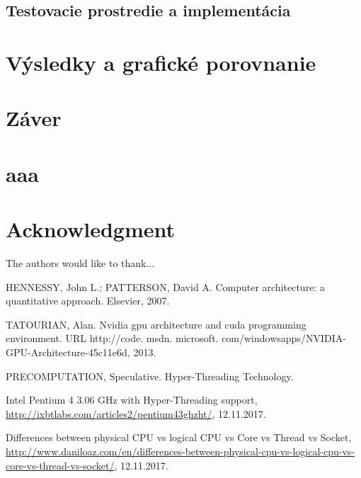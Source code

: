 \documentclass[conference]{IEEEtran}
\begin{document}
\subsection{Testovacie prostredie a implementácia}

\section{Výsledky a grafické porovnanie}

\section{Záver}


\appendices
\section{aaa}



\section*{Acknowledgment}


The authors would like to thank...


\ifCLASSOPTIONcaptionsoff
  \newpage
\fi




\begin{thebibliography}{1}

HENNESSY, John L.; PATTERSON, David A. Computer architecture: a quantitative approach. Elsevier, 2007.

TATOURIAN, Alan. Nvidia gpu architecture and cuda programming environment. URL http://code. msdn. microsoft. com/windowsapps/NVIDIA-GPU-Architecture-45c11e6d, 2013.

PRECOMPUTATION, Speculative. Hyper-Threading Technology.

Intel Pentium 4 3.06 GHz with Hyper-Threading support, \url{http://ixbtlabs.com/articles2/pentium43ghzht/}, 12.11.2017.

Differences between physical CPU vs logical CPU vs Core vs Thread vs Socket, \url{http://www.daniloaz.com/en/differences-between-physical-cpu-vs-logical-cpu-vs-core-vs-thread-vs-socket/}, 12.11.2017.




\end{thebibliography}
\end{document}
